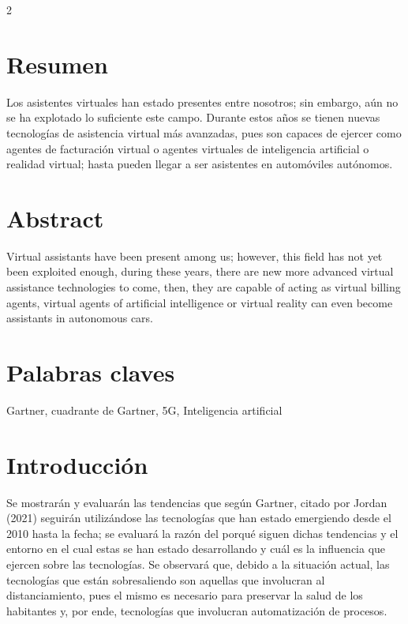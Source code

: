 \documentclass[12pt,spanish,Letterpaper,openany]{book}
\begin{document}
\begin {multicols}{2}

\hypertarget{resumen-5}{%
\section{Resumen}\label{resumen-5}}

Los asistentes virtuales han estado presentes entre nosotros; sin embargo, aún no se ha explotado lo suficiente este campo. Durante estos años se tienen nuevas tecnologías de asistencia virtual más avanzadas, pues son capaces de ejercer como agentes de facturación virtual o agentes virtuales de inteligencia artificial o realidad virtual; hasta pueden llegar a ser asistentes en automóviles autónomos.

\hypertarget{abstract-5}{%
\section{Abstract}\label{abstract-5}}

Virtual assistants have been present among us; however, this field has not yet been exploited enough, during these years, there are new more advanced virtual assistance technologies to come, then, they are capable of acting as virtual billing agents, virtual agents of artificial intelligence or virtual reality can even become assistants in autonomous cars.

\hypertarget{palabras-claves-5}{%
\section{Palabras claves}\label{palabras-claves-5}}

Gartner, cuadrante de Gartner, 5G, Inteligencia artificial

\hypertarget{introducciuxf3n-5}{%
\section{Introducción}\label{introducciuxf3n-5}}

Se mostrarán y evaluarán las tendencias que según Gartner, citado por Jordan (2021) seguirán utilizándose las tecnologías que han estado emergiendo desde el 2010 hasta la fecha; se evaluará la razón del porqué siguen dichas tendencias y el entorno en el cual estas se han estado desarrollando y cuál es la influencia que ejercen sobre las tecnologías.
Se observará que, debido a la situación actual, las tecnologías que están sobresaliendo son aquellas que involucran al distanciamiento, pues el mismo es necesario para preservar la salud de los habitantes y, por ende, tecnologías que involucran automatización de procesos.


\end{multicols}
\end{document}
